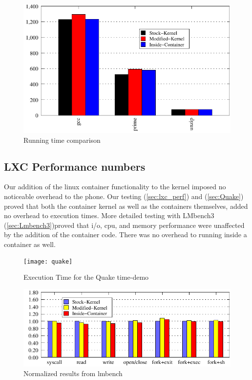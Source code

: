 \begin{figure}[tbh]
\centering
\includegraphics[width=1.0\columnwidth]{perf}
\caption{Running time comparison}
\label{fig:perf}
\end{figure}

\subsection{LXC Performance numbers}

Our addition of the linux container functionality to the kernel imposed no noticeable overhead to the phone.  Our testing (\ref{sec:lxc_perf}) and (\ref{sec:Quake}) proved that both the container kernel as well as the containers themselves, added no overhead to execution times.  More detailed testing with LMbench3 (\ref{sec:Lmbench3})proved that i/o, cpu, and memory performance were unaffected by the addition of the container code.  There was no overhead to running inside a container as well.  

\begin{figure}[tbh]
\centering
\texttt{[image: quake]}
\caption{Execution Time for the Quake time-demo}
\label{fig:Quake}
\end{figure}

\begin{figure}[bth]
\centering
\includegraphics[width=1.0\columnwidth]{lmbench}
\caption{Normalized results from lmbench}
\label{fig:lmbench}
\end{figure}


